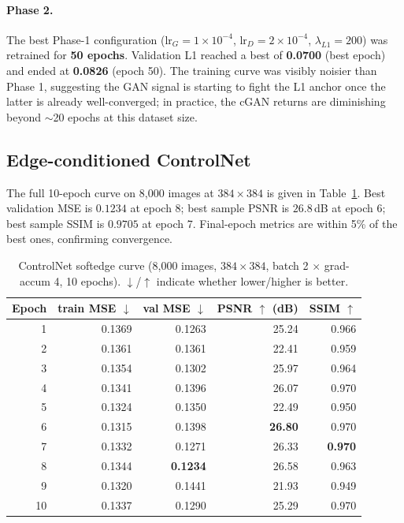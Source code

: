\documentclass[conference]{IEEEtran}
\begin{document}
\paragraph{Phase 2.} The best Phase-1 configuration
($\mathrm{lr}_G\!=\!1{\times}10^{-4}$, $\mathrm{lr}_D\!=\!2{\times}10^{-4}$,
$\lambda_{L1}\!=\!200$) was retrained for \textbf{50 epochs}. Validation L1
reached a best of \textbf{0.0700} (best epoch) and ended at
\textbf{0.0826} (epoch 50). The training curve was visibly noisier than
Phase 1, suggesting the GAN signal is starting to fight the L1 anchor
once the latter is already well-converged; in practice, the cGAN
returns are diminishing beyond $\sim$20 epochs at this dataset size.

\subsection{Edge-conditioned ControlNet}
The full 10-epoch curve on 8{,}000 images at $384\times384$ is given in
Table~\ref{tab:cnet}. Best validation MSE is $0.1234$ at epoch 8; best
sample PSNR is $26.8$\,dB at epoch 6; best sample SSIM is $0.9705$ at
epoch 7. Final-epoch metrics are within 5\% of the best ones,
confirming convergence.

\begin{table}[!t]
\centering
\caption{ControlNet softedge curve (8{,}000 images,
$384\times384$, batch 2 $\times$ grad-accum 4, 10 epochs).
$\downarrow$/$\uparrow$ indicate whether lower/higher is better.}
\label{tab:cnet}
\setlength\tabcolsep{5pt}
\begin{tabular}{rrrrr}
\toprule
\textbf{Epoch} & train MSE $\downarrow$ & val MSE $\downarrow$ & PSNR $\uparrow$ (dB) & SSIM $\uparrow$ \\
\midrule
1  & 0.1369 & 0.1263 & 25.24 & 0.966 \\
2  & 0.1361 & 0.1361 & 22.41 & 0.959 \\
3  & 0.1354 & 0.1302 & 25.97 & 0.964 \\
4  & 0.1341 & 0.1396 & 26.07 & 0.970 \\
5  & 0.1324 & 0.1350 & 22.49 & 0.950 \\
6  & 0.1315 & 0.1398 & \textbf{26.80} & 0.970 \\
7  & 0.1332 & 0.1271 & 26.33 & \textbf{0.970} \\
\rowcolor{blue!8}
8  & 0.1344 & \textbf{0.1234} & 26.58 & 0.963 \\
9  & 0.1320 & 0.1441 & 21.93 & 0.949 \\
10 & 0.1337 & 0.1290 & 25.29 & 0.970 \\
\bottomrule
\end{tabular}
\end{table}
\end{document}
